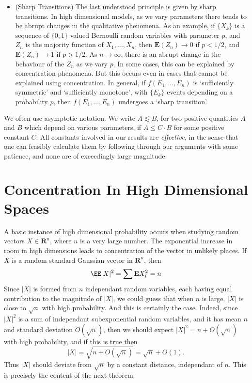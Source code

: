 \begin{itemize}
    \item (Sharp Transitions) The last understood principle is given by sharp transitions. In high dimensional models, as we vary parameters there tends to be abrupt changes in the qualitative phenomena. As an example, if $\{ X_k \}$ is a sequence of $\{ 0, 1 \}$ valued Bernoulli random variables with parameter $p$, and $Z_n$ is the majority function of $X_1, \dots, X_n$, then $\mathbf{E}(Z_n) \to 0$ if $p < 1/2$, and $\mathbf{E}(Z_n) \to 1$ if $p > 1/2$. As $n \to \infty$, there is an abrupt change in the behaviour of the $Z_n$ as we vary $p$. In some cases, this can be explained by concentration phenomena. But this occurs even in cases that cannot be explained using concentration. In general, if $f(E_1, \dots, E_n)$ is `sufficiently symmetric' and `sufficiently monotone', with $\{ E_k \}$ events depending on a probability $p$, then $f(E_1, \dots, E_n)$ undergoes a `sharp transition'.
\end{itemize}

We often use asymptotic notation. We write $A \lesssim B$, for two positive quantities $A$ and $B$ which depend on various parameters, if $A \leq C \cdot B$ for some positive constant $C$. All constants involved in our results are {\it effective}, in the sense that one can feasibly calculate them by following through our arguments with some patience, and none are of exceedingly large magnitude.











\chapter{Concentration In High Dimensional Spaces}

A basic instance of high dimensional probability occurs when studying random vectors $X \in \mathbf{R}^n$, where $n$ is a very large number. The exponential increase in room in high dimensions leads to concentration of the vector in unlikely places. If $X$ is a random standard Gaussian vector in $\mathbf{R}^n$, then
%
\[ \EE |X|^2 = \sum \mathbf{E} X_i^2 = n \]
%
Since $|X|$ is formed from $n$ independant random variables, each having equal contribution to the magnitude of $|X|$, we could guess that when $n$ is large, $|X|$ is close to $\sqrt{n}$ with high probability. And this is certainly the case. Indeed, since $|X|^2$ is a sum of independant subexponential random variables, and it has mean $n$ and standard deviation $O(\sqrt{n})$, then we should expect $|X|^2 = n + O(\sqrt{n})$ with high probability, and if this is true then
%
\[ |X| = \sqrt{n + O \left(\sqrt{n}\right) } = \sqrt{n} + O(1). \]
%
Thus $|X|$ should deviate from $\sqrt{n}$ by a constant distance, independant of $n$. This is precisely the content of the next theorem.

